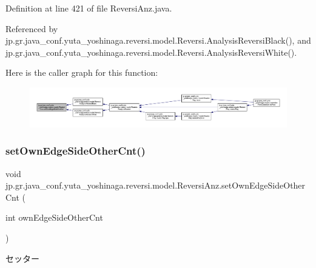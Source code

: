Definition at line 421 of file Reversi\+Anz.\+java.



Referenced by jp.\+gr.\+java\+\_\+conf.\+yuta\+\_\+yoshinaga.\+reversi.\+model.\+Reversi.\+Analysis\+Reversi\+Black(), and jp.\+gr.\+java\+\_\+conf.\+yuta\+\_\+yoshinaga.\+reversi.\+model.\+Reversi.\+Analysis\+Reversi\+White().

Here is the caller graph for this function\+:
\nopagebreak
\begin{figure}[H]
\begin{center}
\leavevmode
\includegraphics[width=350pt]{classjp_1_1gr_1_1java__conf_1_1yuta__yoshinaga_1_1reversi_1_1model_1_1_reversi_anz_a637da35cb4ecce8e7b33c1d96b483a0e_icgraph}
\end{center}
\end{figure}
\mbox{\label{classjp_1_1gr_1_1java__conf_1_1yuta__yoshinaga_1_1reversi_1_1model_1_1_reversi_anz_ac636e4020b682188e70e3b983fd3d4e4}} 
\subsubsection{\texorpdfstring{set\+Own\+Edge\+Side\+Other\+Cnt()}{setOwnEdgeSideOtherCnt()}}
{\footnotesize\ttfamily void jp.\+gr.\+java\+\_\+conf.\+yuta\+\_\+yoshinaga.\+reversi.\+model.\+Reversi\+Anz.\+set\+Own\+Edge\+Side\+Other\+Cnt (\begin{DoxyParamCaption}\item[{int}]{own\+Edge\+Side\+Other\+Cnt }\end{DoxyParamCaption})}



セッター 


